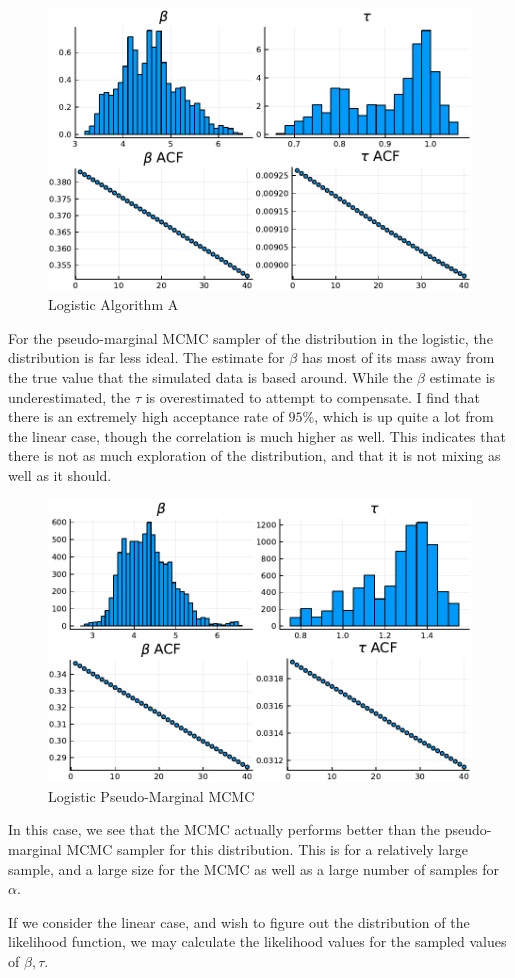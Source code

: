 \documentclass[12pt]{paper}
\begin{document}
\begin{figure}[h!]
  \includegraphics[width=.9\linewidth]{./Logit_A.pdf}
  \caption{Logistic Algorithm A}
\end{figure}

For the pseudo-marginal MCMC sampler of the distribution in the
logistic, the distribution is far less ideal. The estimate for $\beta$ has
most of its mass away from the true value that the simulated data is
based around. While the $\beta$ estimate is underestimated, the $\tau$ is
overestimated to attempt to compensate. I find that there is an
extremely high acceptance rate of $95\%$, which is up quite a lot from
the linear case, though the correlation is much higher as well. This
indicates that there is not as much exploration of the distribution,
and that it is not mixing as well as it should.

\begin{figure}[h!]
  \includegraphics[width=.9\linewidth]{./Logistic.pdf}
  \caption{Logistic Pseudo-Marginal MCMC}
\end{figure}

In this case, we see that the MCMC actually performs better than the
pseudo-marginal MCMC sampler for this distribution. This is for a
relatively large sample, and a large size for the MCMC as well as a
large number of samples for $\alpha$.

If we consider the linear case, and wish to figure out the
distribution of the likelihood function, we may calculate the
likelihood values for the sampled values of $\beta,\tau$.
\end{document}
